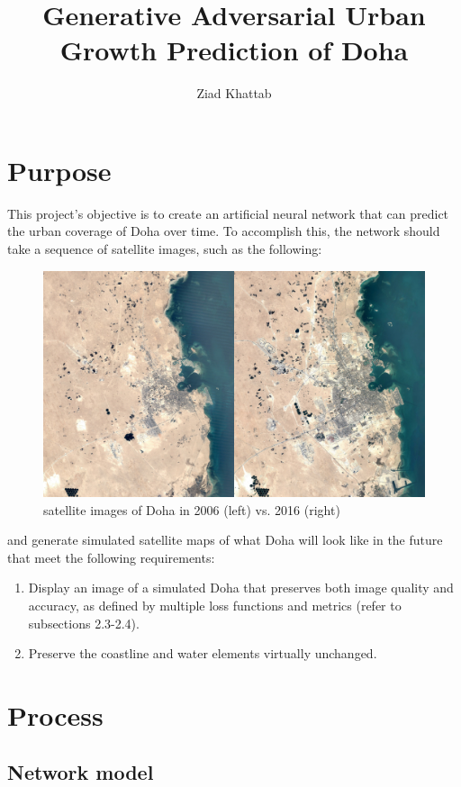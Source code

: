 \documentclass{article}
\title{\huge{Generative Adversarial Urban Growth Prediction of Doha}}
\author{Ziad Khattab}
\date{}
\begin{document}
\maketitle

\section{Purpose}
This project's objective is to create an artificial neural network that can predict the urban coverage of Doha over time. To accomplish this, the network should take a sequence of satellite images, such as the following: 

\begin{figure}[H]
    \caption{satellite images of Doha in 2006 (left) vs. 2016 (right)}
    \centering
    \includegraphics[width=0.7\linewidth]{2006-2016-comp.png}
\end{figure}

and generate simulated satellite maps of what Doha will look like in the future that meet the following requirements:
\begin{enumerate}[label=(\alph*)]
    \item Display an image of a simulated Doha that preserves both image quality and accuracy, as defined by multiple loss functions and metrics (refer to subsections 2.3-2.4). 
    \item Preserve the coastline and water elements virtually unchanged.
\end{enumerate}

\clearpage

\section{Process}

\subsection{Network model}
\end{document}
